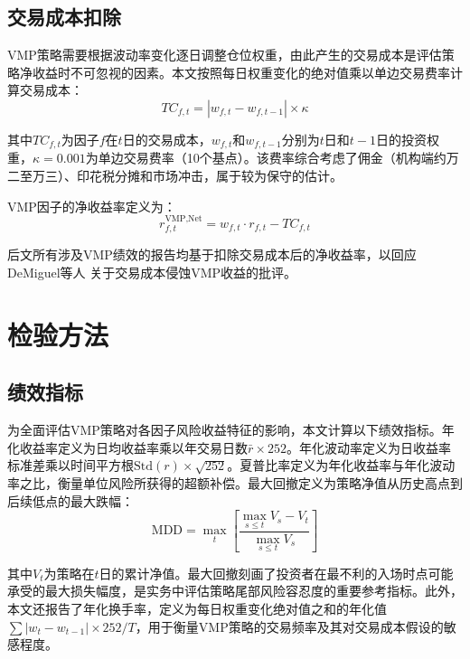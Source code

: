 \documentclass[
    decl-page,
    oneside,
  ]{njuthesis}
\begin{document}
\subsection{交易成本扣除}

VMP策略需要根据波动率变化逐日调整仓位权重，由此产生的交易成本是评估策略净收益时不可忽视的因素。本文按照每日权重变化的绝对值乘以单边交易费率计算交易成本：
\begin{equation}
  TC_{f,t} = |w_{f,t} - w_{f,t-1}| \times \kappa
  \label{eq:tc}
\end{equation}

其中$TC_{f,t}$为因子$f$在$t$日的交易成本，$w_{f,t}$和$w_{f,t-1}$分别为$t$日和$t-1$日的投资权重，$\kappa = 0.001$为单边交易费率（10个基点）。该费率综合考虑了佣金（机构端约万二至万三）、印花税分摊和市场冲击，属于较为保守的估计。

VMP因子的净收益率定义为：
\begin{equation}
  r_{f,t}^{\text{VMP,Net}} = w_{f,t} \cdot r_{f,t} - TC_{f,t}
  \label{eq:vmp_net}
\end{equation}

后文所有涉及VMP绩效的报告均基于扣除交易成本后的净收益率，以回应DeMiguel等人 \cite{demiguel2024transaction} 关于交易成本侵蚀VMP收益的批评。

\section{检验方法}

\subsection{绩效指标}

为全面评估VMP策略对各因子风险收益特征的影响，本文计算以下绩效指标。年化收益率定义为日均收益率乘以年交易日数$\bar{r} \times 252$。年化波动率定义为日收益率标准差乘以时间平方根$\text{Std}(r) \times \sqrt{252}$。夏普比率定义为年化收益率与年化波动率之比，衡量单位风险所获得的超额补偿。最大回撤定义为策略净值从历史高点到后续低点的最大跌幅：
\begin{equation}
  \text{MDD} = \max_t \left[\frac{\max_{s \leq t} V_s - V_t}{\max_{s \leq t} V_s}\right]
  \label{eq:mdd}
\end{equation}

其中$V_t$为策略在$t$日的累计净值。最大回撤刻画了投资者在最不利的入场时点可能承受的最大损失幅度，是实务中评估策略尾部风险容忍度的重要参考指标。此外，本文还报告了年化换手率，定义为每日权重变化绝对值之和的年化值$\sum |w_t - w_{t-1}| \times 252 / T$，用于衡量VMP策略的交易频率及其对交易成本假设的敏感程度。
\end{document}
